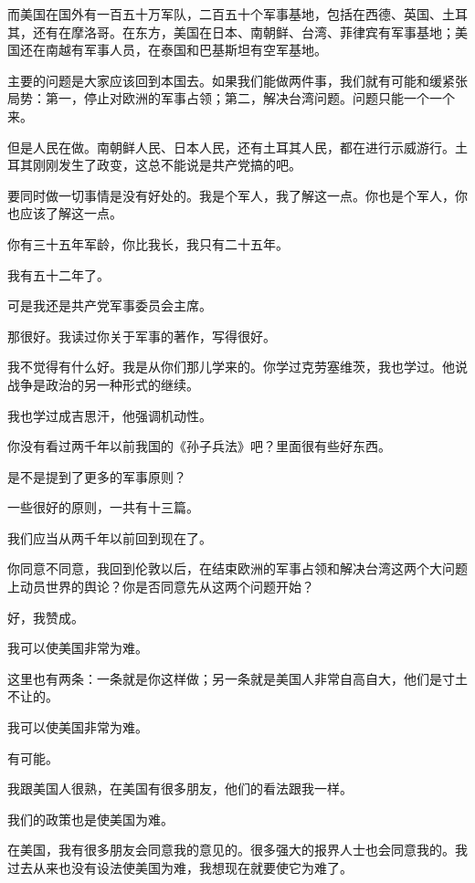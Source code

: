 而美国在国外有一百五十万军队，二百五十个军事基地，包括在西德、英国、土耳其，还有在摩洛哥。在东方，美国在日本、南朝鲜、台湾、菲律宾有军事基地；美国还在南越有军事人员，在泰国和巴基斯坦有空军基地。

主要的问题是大家应该回到本国去。如果我们能做两件事，我们就有可能和缓紧张局势：第一，停止对欧洲的军事占领；第二，解决台湾问题。问题只能一个一个来。

但是人民在做。南朝鲜人民、日本人民，还有土耳其人民，都在进行示威游行。土耳其刚刚发生了政变，这总不能说是共产党搞的吧。

要同时做一切事情是没有好处的。我是个军人，我了解这一点。你也是个军人，你也应该了解这一点。

你有三十五年军龄，你比我长，我只有二十五年。

我有五十二年了。

可是我还是共产党军事委员会主席。

那很好。我读过你关于军事的著作，写得很好。

我不觉得有什么好。我是从你们那儿学来的。你学过克劳塞维茨，我也学过。他说战争是政治的另一种形式的继续。

我也学过成吉思汗，他强调机动性。

你没有看过两千年以前我国的《孙子兵法》吧？里面很有些好东西。

是不是提到了更多的军事原则？

一些很好的原则，一共有十三篇。

我们应当从两千年以前回到现在了。

你同意不同意，我回到伦敦以后，在结束欧洲的军事占领和解决台湾这两个大问题上动员世界的舆论？你是否同意先从这两个问题开始？

好，我赞成。

我可以使美国非常为难。

这里也有两条：一条就是你这样做；另一条就是美国人非常自高自大，他们是寸土不让的。

我可以使美国非常为难。

有可能。

我跟美国人很熟，在美国有很多朋友，他们的看法跟我一样。

我们的政策也是使美国为难。

在美国，我有很多朋友会同意我的意见的。很多强大的报界人士也会同意我的。我过去从来也没有设法使美国为难，我想现在就要使它为难了。

